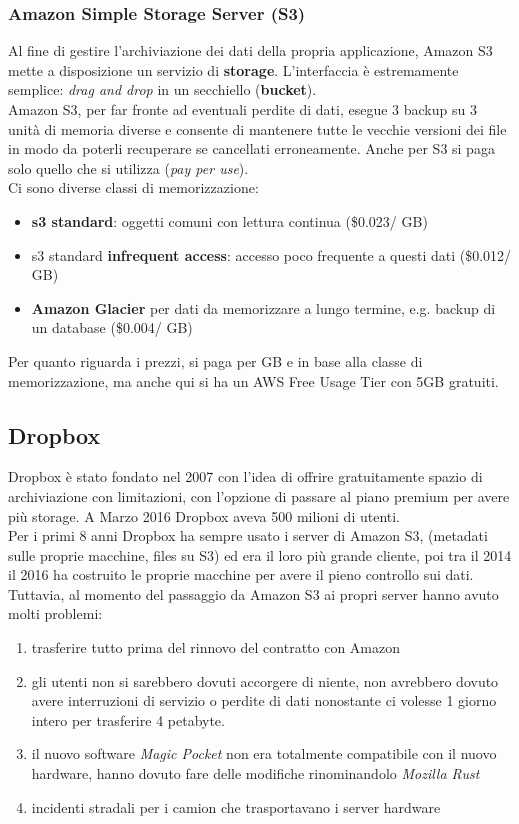 \subsubsection{Amazon Simple Storage Server (S3)}
Al fine di gestire l’archiviazione dei dati della propria applicazione, Amazon S3 mette a disposizione un servizio di \textbf{storage}. L’interfaccia è estremamente semplice: \textit{drag and drop} in un secchiello (\textbf{bucket}).\\
Amazon S3, per far fronte ad eventuali perdite di dati, esegue 3 backup su 3 unità di memoria diverse e consente di mantenere tutte le vecchie versioni dei file in modo da poterli recuperare se cancellati erroneamente.
Anche per S3 si paga solo quello che si utilizza (\textit{pay per use}).\\
Ci sono diverse  classi di memorizzazione:
\begin{itemize}
    \item \textbf{s3 standard}: oggetti comuni con lettura continua (\$0.023/ GB)
    \item s3 standard \textbf{infrequent access}: accesso poco frequente a questi dati (\$0.012/ GB)
    \item \textbf{Amazon Glacier} per dati da memorizzare a lungo termine, e.g. backup di un database (\$0.004/ GB)
\end{itemize}
Per quanto riguarda i prezzi, si paga per GB e in base alla classe di memorizzazione, ma anche qui si ha un AWS Free Usage Tier con 5GB gratuiti.

\subsection{Dropbox}
Dropbox è stato fondato nel 2007 con l'idea di offrire gratuitamente spazio di archiviazione con limitazioni, con l'opzione di passare al piano premium per avere più storage. A Marzo 2016 Dropbox aveva 500 milioni di utenti.\\
Per i primi 8 anni Dropbox ha sempre usato i server di Amazon S3, (metadati sulle proprie macchine, files su S3) ed era il loro più grande cliente, poi tra il 2014 il 2016 ha costruito le proprie macchine per avere il pieno controllo sui dati. Tuttavia, al momento del passaggio da Amazon S3 ai propri server hanno avuto molti problemi:
\begin{enumerate}
    \item trasferire tutto prima del rinnovo del contratto con Amazon
    \item gli utenti non si sarebbero dovuti accorgere di niente, non avrebbero dovuto avere interruzioni di servizio o perdite di dati nonostante ci volesse 1 giorno intero per trasferire 4 petabyte.
    \item il nuovo software \textit{Magic Pocket} non era totalmente compatibile con il nuovo hardware, hanno dovuto fare delle modifiche rinominandolo \textit{Mozilla Rust}
    \item incidenti stradali per i camion che trasportavano i server hardware
\end{enumerate}

